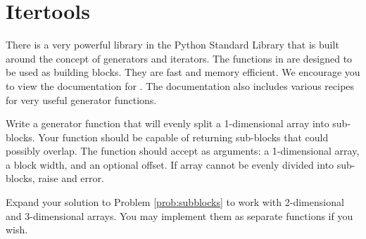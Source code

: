 \section*{Itertools}
There is a very powerful library in the Python Standard Library that is built around the concept
of generators and iterators.  The functions in  are designed to be used as
building blocks.  They are fast and memory efficient.
We encourage you to view the documentation for .
The documentation also includes various recipes for very useful generator functions.

\begin{problem}
\label{prob:subblocks}
Write a generator function that will evenly split a 1-dimensional array into sub-blocks.
Your function should be capable of returning sub-blocks that could possibly overlap.
The function should accept as arguments: a 1-dimensional array,
a block width, and an optional offset.  If array cannot be evenly divided into
sub-blocks, raise and error.
\end{problem}

\begin{problem}
Expand your solution to Problem \ref{prob:subblocks} to work with 2-dimensional and 3-dimensional
arrays.  You may implement them as separate functions if you wish.
\end{problem}

\printbibliography

% 

